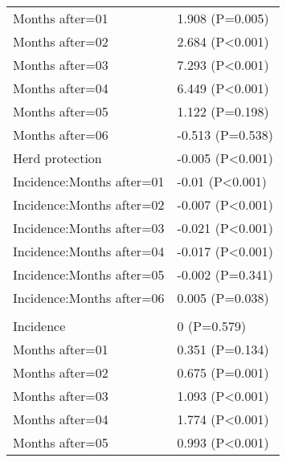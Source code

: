 \documentclass[]{article}
\begin{document}
\begin{longtable}[t]{ll}
\hspace{1em}Months after=01 & 1.908 (P=0.005)\\
\hspace{1em}Months after=02 & 2.684 (P<0.001)\\
\hspace{1em}Months after=03 & 7.293 (P<0.001)\\
\hspace{1em}Months after=04 & 6.449 (P<0.001)\\
\hspace{1em}Months after=05 & 1.122 (P=0.198)\\
\hspace{1em}Months after=06 & -0.513 (P=0.538)\\
\hspace{1em}Herd protection & -0.005 (P<0.001)\\
\hspace{1em}Incidence:Months after=01 & -0.01 (P<0.001)\\
\hspace{1em}Incidence:Months after=02 & -0.007 (P<0.001)\\
\hspace{1em}Incidence:Months after=03 & -0.021 (P<0.001)\\
\hspace{1em}Incidence:Months after=04 & -0.017 (P<0.001)\\
\hspace{1em}Incidence:Months after=05 & -0.002 (P=0.341)\\
\hspace{1em}Incidence:Months after=06 & 0.005 (P=0.038)\\
\addlinespace[1.5em]
\multicolumn{2}{l}{\textbf{Temporary field worker}}\\
\hspace{1em}Incidence & 0 (P=0.579)\\
\hspace{1em}Months after=01 & 0.351 (P=0.134)\\
\hspace{1em}Months after=02 & 0.675 (P=0.001)\\
\hspace{1em}Months after=03 & 1.093 (P<0.001)\\
\hspace{1em}Months after=04 & 1.774 (P<0.001)\\
\hspace{1em}Months after=05 & 0.993 (P<0.001)\\

\end{longtable}
\end{document}
